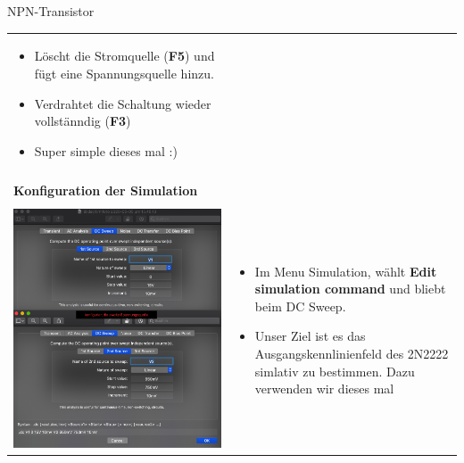 \begin{frame}[t]{NPN-Transistor}
\begin{spacing}{0.9}
\begin{tiny}
\begin{table}[h!]
\begin{tabular}{p{3cm} p{7cm}}
\begin{minipage}{.7\textwidth}
\begin{itemize}
              \item Löscht die Stromquelle (\textbf{F5}) und fügt eine Spannungsquelle hinzu.
              \item Verdrahtet die Schaltung wieder vollstänndig (\textbf{F3})
              \item Super simple dieses mal :)
            \end{itemize}
          \end{minipage}
          \\
                                                & \\
          \hline
          \textbf{Konfiguration der Simulation} & \\
          \hline                                  \\
          \begin{minipage}{.3\textwidth}
            \includegraphics[width=0.8\linewidth]{pictures/simulationcmd_4.png}
          \end{minipage}
                                                &
          \begin{minipage}{.7\textwidth}
            \begin{itemize}
              \item Im Menu Simulation, wählt \textbf{Edit simulation command} und bliebt beim DC Sweep.
              \item Unser Ziel ist es das Ausgangskennlinienfeld des 2N2222 simlativ zu bestimmen. Dazu verwenden wir dieses mal

\end{itemize}
\end{minipage}
\end{tabular}
\end{table}
\end{tiny}
\end{spacing}
\end{frame}
